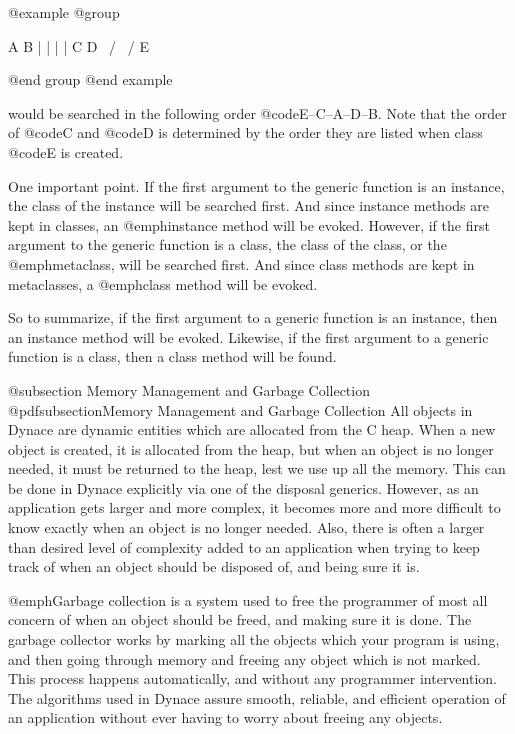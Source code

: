 @example
@group

               A     B
               |     |
               |     |
               C     D
                \   /
                 \ /
                  E

@end group
@end example

would be searched in the following order @code{E--C--A--D--B}.  Note that
the order of @code{C} and @code{D} is determined by the order they are
listed when class @code{E} is created.

One important point.  If the first argument to the generic function is
an instance, the class of the instance will be searched first.  And
since instance methods are kept in classes, an @emph{instance} method
will be evoked.  However, if the first argument to the generic function
is a class, the class of the class, or the @emph{metaclass}, will be
searched first.  And since class methods are kept in metaclasses, a
@emph{class} method will be evoked.

So to summarize, if the first argument to a generic function is an
instance, then an instance method will be evoked.  Likewise, if the
first argument to a generic function is a class, then a class method
will be found.

@subsection Memory Management and Garbage Collection
@pdfsubsection{Memory Management and Garbage Collection}
All objects in Dynace are dynamic entities which are allocated from the C
heap.  When a new object is created, it is allocated from the heap, but
when an object is no longer needed, it must be returned to the heap,
lest we use up all the memory.  This can be done in Dynace explicitly via
one of the disposal generics.  However, as an application gets larger
and more complex, it becomes more and more difficult to know exactly
when an object is no longer needed.  Also, there is often a larger than
desired level of complexity added to an application when trying to keep
track of when an object should be disposed of, and being sure it is.

@emph{Garbage collection} is a system used to free the programmer of
most all concern of when an object should be freed, and making sure it
is done.  The garbage collector works by marking all the objects which
your program is using, and then going through memory and freeing any
object which is not marked.  This process happens automatically, and
without any programmer intervention.  The algorithms used in Dynace assure
smooth, reliable, and efficient operation of an application without
ever having to worry about freeing any objects.


